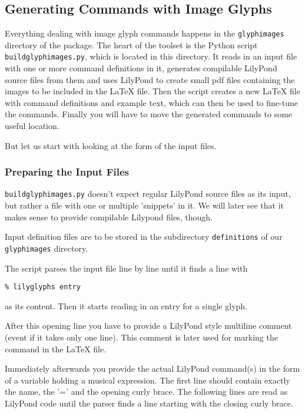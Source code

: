\documentclass{article}
\begin{document}
\subsection{Generating Commands with Image Glyphs}
\label{generating_commands_image}

Everything dealing with image glyph commands happens in the \texttt{glyphimages} directory of the \lilyglyphs{} package.
The heart of the toolset is the Python script \texttt{buildglyphimages.py}, which is located in this directory.
It reads in an input file with one or more command definitions in it, generates compilable LilyPond source files from them and uses LilyPond to create small pdf files containing the images to be included in the \LaTeX{} file.
Then the script creates a new \LaTeX{} file with command definitions and example text, which can then be used to fine-tune the commands.
Finally you will have to move the generated commands to some useful location.

But let us start with looking at the form of the input files.


\subsubsection{Preparing the Input Files}
\label{subsubsec:BGI_preparing_input}
\texttt{buildglyphimages.py} doesn't expect regular LilyPond source files as its input, but rather a file with one or multiple 'snippets' in it. 
We will later see that it makes sense to provide compilable Lilypond files, though.

Input definition files are to be stored in the subdirectory \texttt{definitions} of our \texttt{glyphimages} directory.

The script parses the input file line by line until it finds a line with
\begin{verbatim}
% lilyglyphs entry
\end{verbatim}

as its content.
Then it starts reading in an entry for a single glyph.

After this opening line you have to provide a LilyPond style multiline comment (event if it takes only one line).
This comment is later used for marking the command in the \LaTeX{} file.

Immediately afterwards you provide the actual LilyPond command(s) in the form of a variable holding a musical expression.
The first line should contain exactly the name, the '=' and the opening curly brace.
The following lines are read as LilyPond code until the parser finds a line starting with the closing curly brace.
\end{document}
